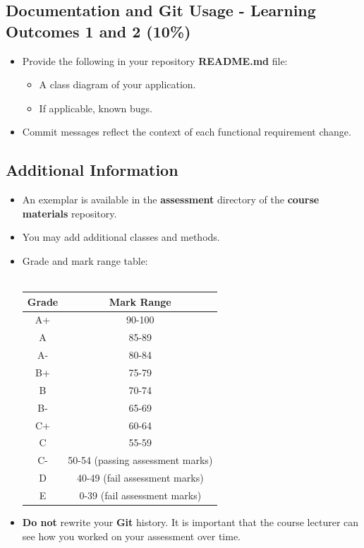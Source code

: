 \documentclass{article}
\begin{document}
\subsection*{Documentation and Git Usage - Learning Outcomes 1 and 2 (10\%)}
\begin{itemize}
    \item Provide the following in your repository \textbf{README.md} file:
    \begin{itemize}
        \item A class diagram of your application.
        \item If applicable, known bugs.
    \end{itemize}
    \item Commit messages reflect the context of each functional requirement change.
\end{itemize}

\subsection*{Additional Information}
\begin{itemize}
    \item An exemplar is available in the \textbf{assessment} directory of the \textbf{course materials} repository.
    \item You may add additional classes and methods. 
    \item Grade and mark range table:\\\\
    \renewcommand{\arraystretch}{1.5}
    \begin{tabular}{|c|c|}
        \hline
        \textbf{Grade} & \textbf{Mark Range} \\ \hline
        A+ & 90-100  \\ \hline
        A & 85-89  \\ \hline
        A- & 80-84 \\ \hline
        B+ & 75-79   \\ \hline
        B & 70-74  \\ \hline
        B- & 65-69  \\ \hline
        C+ & 60-64  \\ \hline
        C & 55-59 \\ \hline
        C- & 50-54 (passing assessment marks)  \\ \hline
        D & 40-49 (fail assessment marks)   \\ \hline
        E & 0-39 (fail assessment marks)   \\ \hline
    \end{tabular}
    \item \textbf{Do not} rewrite your \textbf{Git} history. It is important that the course lecturer can see how you worked on your assessment over time.
\end{itemize}
\end{document}
